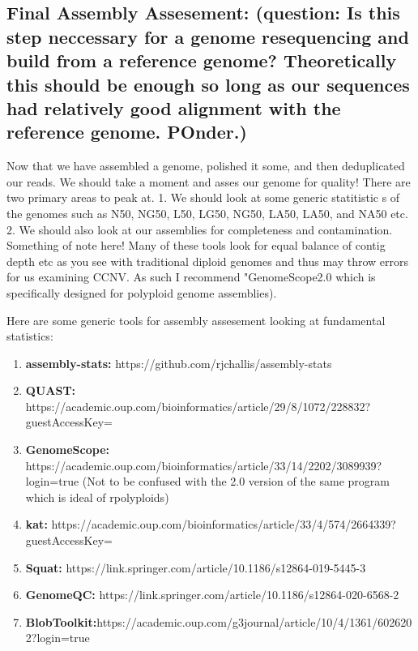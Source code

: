 \documentclass{article}
\begin{document}
    \newpage
    \subsection{\textbf{Final Assembly Assesement: (question: Is this step neccessary for a genome resequencing and build from a reference genome?   Theoretically this should be enough so long as our sequences had relatively good alignment with the reference genome.  POnder.)}}  Now that we have assembled a genome, polished  it some, and then deduplicated our reads.  We should take a moment and asses our genome for quality!   There are two primary areas to peak at.   1. We should look at some generic statitistic s of the genomes such as N50, NG50, L50, LG50, NG50, LA50, LA50, and NA50 etc.     2. We should also look at our assemblies for completeness and contamination. Something of note here!    Many of these tools look for equal balance of contig depth etc as you see with traditional diploid genomes and thus may throw errors for us examining CCNV.   As such I recommend "GenomeScope2.0 which is specifically designed for polyploid genome assemblies).

    Here are some generic tools for assembly assesement looking at fundamental statistics:
    \begin{enumerate}
        \item \textbf{assembly-stats:} https://github.com/rjchallis/assembly-stats
        \item \textbf{QUAST:} https://academic.oup.com/bioinformatics/article/29/8/1072/228832?guestAccessKey=
        \item \textbf{GenomeScope:} https://academic.oup.com/bioinformatics/article/33/14/2202/3089939?login=true   (Not to be confused with the 2.0 version of the same program which is ideal of rpolyploids)
        \item \textbf{kat:} https://academic.oup.com/bioinformatics/article/33/4/574/2664339?guestAccessKey=
        \item \textbf{Squat:} https://link.springer.com/article/10.1186/s12864-019-5445-3
        \item \textbf{GenomeQC:} https://link.springer.com/article/10.1186/s12864-020-6568-2
        \item \textbf{BlobToolkit:}https://academic.oup.com/g3journal/article/10/4/1361/6026202?login=true
    \end{enumerate}
\end{document}
